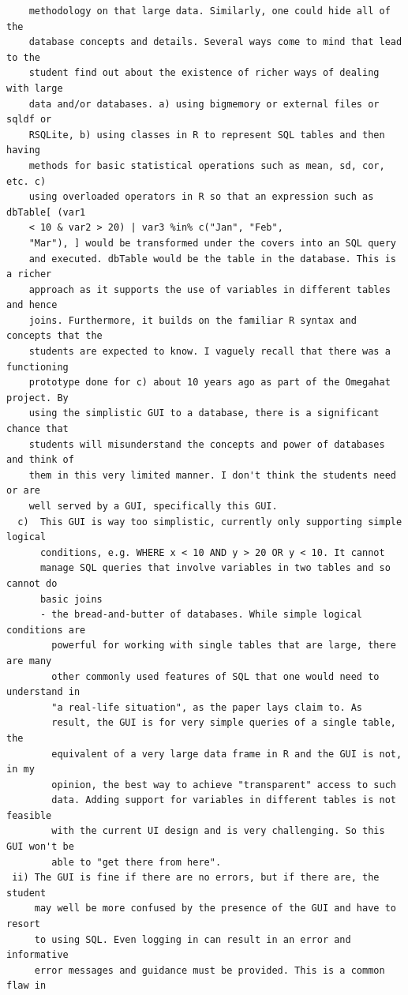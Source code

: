 \documentclass[11pt]{tise_style}
\begin{document}
\begin{verbatim}
    methodology on that large data. Similarly, one could hide all of the
    database concepts and details. Several ways come to mind that lead to the
    student find out about the existence of richer ways of dealing with large
    data and/or databases. a) using bigmemory or external files or sqldf or
    RSQLite, b) using classes in R to represent SQL tables and then having
    methods for basic statistical operations such as mean, sd, cor, etc. c)
    using overloaded operators in R so that an expression such as dbTable[ (var1
    < 10 & var2 > 20) | var3 %in% c("Jan", "Feb",
    "Mar"), ] would be transformed under the covers into an SQL query
    and executed. dbTable would be the table in the database. This is a richer
    approach as it supports the use of variables in different tables and hence
    joins. Furthermore, it builds on the familiar R syntax and concepts that the
    students are expected to know. I vaguely recall that there was a functioning
    prototype done for c) about 10 years ago as part of the Omegahat project. By
    using the simplistic GUI to a database, there is a significant chance that
    students will misunderstand the concepts and power of databases and think of
    them in this very limited manner. I don't think the students need or are
    well served by a GUI, specifically this GUI.
  c)  This GUI is way too simplistic, currently only supporting simple logical
      conditions, e.g. WHERE x < 10 AND y > 20 OR y < 10. It cannot
      manage SQL queries that involve variables in two tables and so cannot do
      basic joins
      - the bread-and-butter of databases. While simple logical conditions are
        powerful for working with single tables that are large, there are many
        other commonly used features of SQL that one would need to understand in
        "a real-life situation", as the paper lays claim to. As
        result, the GUI is for very simple queries of a single table, the
        equivalent of a very large data frame in R and the GUI is not, in my
        opinion, the best way to achieve "transparent" access to such
        data. Adding support for variables in different tables is not feasible
        with the current UI design and is very challenging. So this GUI won't be
        able to "get there from here".
 ii) The GUI is fine if there are no errors, but if there are, the student
     may well be more confused by the presence of the GUI and have to resort
     to using SQL. Even logging in can result in an error and informative
     error messages and guidance must be provided. This is a common flaw in

\end{verbatim}
\end{document}
